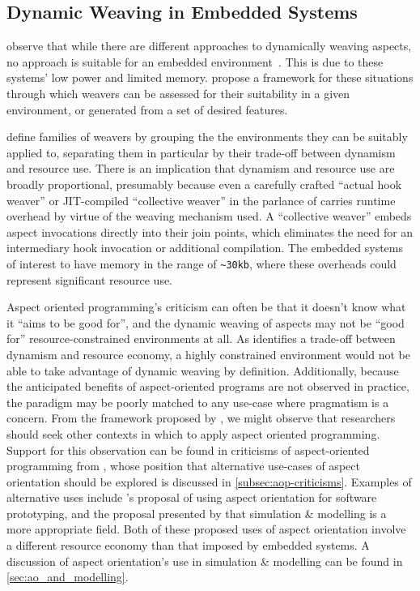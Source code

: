 \subsection{Dynamic Weaving in Embedded Systems}

\citeauthor{gilani2004family} observe that while there are different approaches
to dynamically weaving aspects, no approach is suitable for an embedded
environment~\cite{gilani2004family}. This is due to these systems' low power and
limited memory. \citeauthor{gilani2004family} propose a framework for these
situations through which weavers can be assessed for their suitability in a
given environment, or generated from a set of desired features.

\citeauthor{gilani2004family} define families of weavers by grouping the the
environments they can be suitably applied to, separating them in particular by
their trade-off between dynamism and resource use. There is an implication that
dynamism and resource use are broadly proportional, presumably because even a
carefully crafted ``actual hook weaver'' or JIT-compiled ``collective weaver''
in the parlance of \citet{dynamicAOchitchyan} carries runtime overhead by virtue
of the weaving mechanism used. A ``collective weaver'' embeds aspect invocations
directly into their join points, which eliminates the need for an intermediary
hook invocation or additional compilation. The embedded systems of interest to
\citeauthor{gilani2004family} have memory in the range of \lstinline{~30kb},
where these overheads could represent significant resource use.

Aspect oriented programming's criticism can often be that it doesn't know what
it ``aims to be good for'', and the dynamic weaving of aspects may not be
``good for'' resource-constrained environments at all. As
\citeauthor{gilani2004family} identifies a trade-off between dynamism and
resource economy, a highly constrained environment would not be able to take
advantage of dynamic weaving by definition. Additionally, because the
anticipated benefits of aspect-oriented programs are not observed in practice,
the paradigm may be poorly matched to any use-case where pragmatism is a
concern. From the framework proposed by \citet{gilani2004family}, we might
observe that researchers should seek other contexts in which to apply aspect
oriented programming. Support for this observation can be found in criticisms of
aspect-oriented programming from \citet{steimann06paradoxical}, whose position
that alternative use-cases of aspect orientation should be explored is discussed
in \cref{subsec:aop-criticisms}. Examples of alternative uses include
\citeauthor{popovici2002PROSE}'s proposal of using aspect orientation for
software prototyping, and the proposal presented by \citet{gulyas1999use} that
simulation \& modelling is a more appropriate field. Both of these proposed uses
of aspect orientation involve a different resource economy than that imposed by
embedded systems. A discussion of aspect orientation's use in simulation \&
modelling can be found in \cref{sec:ao_and_modelling}.





